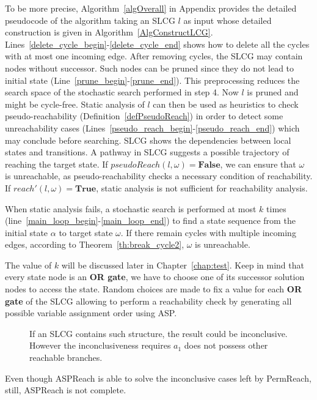 To be more precise, Algorithm~\ref{algOverall} in Appendix provides the detailed pseudocode of the algorithm taking an SLCG $l$ as input whose detailed construction is given in Algorithm~\ref{AlgConstructLCG}.
Lines~\ref{delete_cycle_begin}-\ref{delete_cycle_end} shows how to delete all the cycles with at most one incoming edge.
After removing cycles, the SLCG may contain nodes without successor.
Such nodes can be pruned since they do not lead to initial state (Line~\ref{prune_begin}-\ref{prune_end}).
This preprocessing reduces the search space of the stochastic search performed in step 4.
Now $l$ is pruned and might be cycle-free.
Static analysis of $l$ can then be used as heuristics to check pseudo-reachability (Definition~\ref{defPseudoReach}) in order to detect some unreachability cases (Lines~\ref{pseudo_reach_begin}-\ref{pseudo_reach_end}) which may conclude before searching.
SLCG shows the dependencies between local states and transitions. 
A pathway in SLCG suggests a possible trajectory of reaching the target state. 
If $pseudoReach(l,\omega)=\textbf{False}$, we can ensure that $\omega$ is unreachable, as pseudo-reachability checks a necessary condition of reachability.
If $reach'(l,\omega)=\textbf{True}$, static analysis is not sufficient for reachability analysis. 

When static analysis fails, a stochastic search is performed at most $k$ times (line~\ref{main_loop_begin}-\ref{main_loop_end}) to find a state sequence from the initial state $\alpha$ to target state $\omega$.
If there remain cycles with multiple incoming edges, according to Theorem~\ref{th:break_cycle2}, $\omega$ is unreachable.

The value of $k$ will be discussed later in Chapter~\ref{chap:test}.
Keep in mind that every state node is an \textbf{OR gate}, we have to choose one of its successor solution nodes to access the state. 
Random choices are made to fix a value for each \textbf{OR gate} of the SLCG allowing to perform a reachability check by generating all possible variable assignment order using ASP.




\begin{figure}[ht]
    \centering
    
    \caption[Counterexample of ASPReach]{If an SLCG contains such structure, the result could be inconclusive.
    However the inconclusiveness requires $a_1$ does not possess other reachable branches.}
    \label{fig:lcgInconc}
\end{figure}
Even though ASPReach is able to solve the inconclusive cases left by PermReach, still, ASPReach is not complete.

